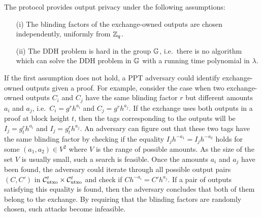  The \RPlus protocol provides output privacy under the following assumptions:
  \begin{enumerate}
    \item[(i)] The blinding factors of the exchange-owned outputs are chosen independently, uniformly from $\mathbb{Z}_q$.
    \item[(ii)] The DDH problem is hard in the group $\mathbb{G}$, i.e.~there is no algorithm which can solve the DDH problem in $\mathbb{G}$ with a running time polynomial in $\lambda$. 
  \end{enumerate}
  If the first assumption does not hold, a \textsf{PPT} adversary could identify exchange-owned outputs given a \RPlus proof. For example, consider the case when two exchange-owned outputs $C_i$ and $C_j$ have the same blinding factor $r$ but different amounts $a_i$ and $a_j$, i.e.~$C_i = g^rh^{a_i}$ and $C_j = g^rh^{a_j}$. If the exchange uses both outputs in a \RPlus proof at block height $t$, then the tags corresponding to the outputs will be $I_j = g_t^rh^{a_i}$ and $I_j = g_t^{r}h^{a_j}$. An adversary can figure out that these two tags have the same blinding factor by checking if the equality $I_j h^{-a_1} = I_j h^{-a_{2}}$ holds for some $(a_1, a_{2}) \in V^2$ where $V$ is the range of possible amounts. As the size of the set $V$ is usually small, such a search is feasible. Once the amounts $a_i$ and $a_j$ have been found, the adversary could iterate through all possible output pairs $(C, C')$ in $\mathcal{C}_{\text{utxo}}^t \times \mathcal{C}_{\text{utxo}}^t$ and check if $C h^{-a_i} = C' h^{a_j}$. If a pair of outputs satisfying this equality is found, then the adversary concludes that both of them belong to the exchange. By requiring that the blinding factors are randomly chosen, such attacks become infeasible.
  
